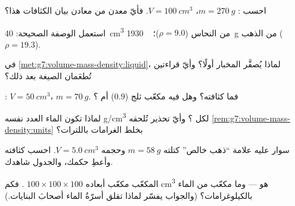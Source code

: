 \begin{exercise}[$\star$]\label{exo:g7:volume-mass-density:2}
احسب : $m = \qty{270}{g}$، $V = \qty{100}{cm^3}$.
فأيّ معدن من معادن بيان الكثافات هذا؟
\end{exercise}

\begin{exercise}[$\star$]\label{exo:g7:volume-mass-density:3}
استعمل الوصفة الصحيحة:  \qty{40}{cm^3} من النحاس
($\rho = 9.0$)؛ \  \qty{1930}{g} من الذهب
($\rho = 19.3$).
\end{exercise}

\begin{exercise}[$\star$]\label{exo:g7:volume-mass-density:4}
في \cref{met:g7:volume-mass-density:liquid}، لماذا يُصفَّر
المخبار أولًا؟ وأيّ قراءتين تُطعَمان الصيغة بعد ذلك؟
\end{exercise}

\begin{exercise}[$\star$]\label{exo:g7:volume-mass-density:5}
: $V = \qty{50}{cm^3}$، $m = \qty{70}{g}$. فما كثافته؟
وهل  فيه مكعّب ثلج ($0.9$) أم ؟
\end{exercise}

\begin{exercise}[$\star$]\label{exo:g7:volume-mass-density:6}
لماذا تكون  الماء العدد نفسه  \unit{g/cm^3} 
لكل ؟ وأيّ تحذير تُلحقه
\cref{rem:g7:volume-mass-density:units} بخلط الغرامات
باللترات؟
\end{exercise}

\begin{exercise}[$\star$]\label{exo:g7:volume-mass-density:7}
سوار عليه علامة ``ذهب خالص'' كتلته $m = \qty{58}{g}$ وحجمه
$V = \qty{5.0}{cm^3}$. احسب كثافته وأعطِ حكمك، والجدول
شاهدك.
\end{exercise}

\begin{exercise}[$\star\star$]\label{exo:g7:volume-mass-density:8}
 المكعّب مكعّب أبعاده $100 \times 100 \times 100$
. فكم \unit{cm^3} هو --- وما   مكعّب من الماء
بالكيلوغرامات؟ (والجواب يفسّر لماذا تقلق أسرّةُ الماء أصحابَ
البنايات.)
\end{exercise}

